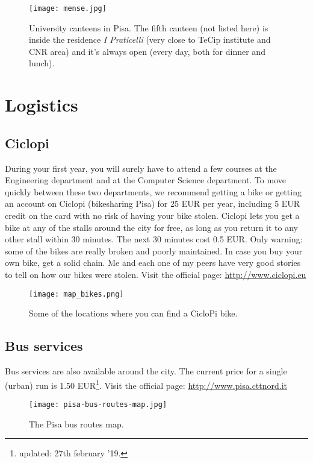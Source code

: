 \documentclass[11pt,fleqn,oneside]{book} %
\begin{document}
\begin{figure}[h]
  \centering\texttt{[image: mense.jpg]}\label{fig:mense}
  \caption{University canteens in Pisa. The fifth canteen (not listed here) is inside the residence \textit{I Praticelli} (very close to TeCip institute and CNR area) and it's always open (every day, both for dinner and lunch).}
\end{figure}



\chapter{Logistics}


\section{Ciclopi}
During your first year, you will surely have to attend a few courses at the Engineering department and at the Computer Science department. To move quickly between these two departments, we recommend getting a bike or getting an account on Ciclopi (bikesharing Pisa) for 25 EUR per year, including 5 EUR credit on the card with no risk of having your bike stolen. Ciclopi lets you get a bike at any of the stalls around the city for free, as long as you return it to any other stall within 30 minutes. The next 30 minutes cost 0.5 EUR. Only warning: some of the bikes are really broken and poorly maintained. In case you buy your own bike, get a solid chain. Me and each one of my peers have very good stories to tell on how our bikes were stolen. 
Visit the official page: \url{http://www.ciclopi.eu}
\begin{figure}[h]
  \centering\texttt{[image: map\_bikes.png]}
  \caption{Some of the locations where you can find a CicloPi bike.}
\end{figure}


\section{Bus services}
Bus services are also available around the city. The current price for a single (urban) run is 1.50 EUR\footnote{updated: 27th february '19.}.
Visit the official page: \url{http://www.pisa.cttnord.it}
\begin{figure}[h]
  \centering\texttt{[image: pisa-bus-routes-map.jpg]}
  \caption{The Pisa bus routes map.}
\end{figure}
\end{document}

